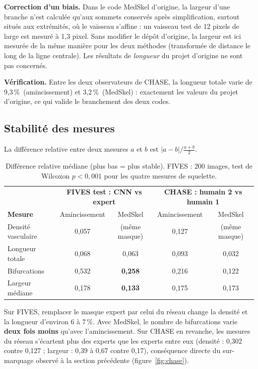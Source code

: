 \documentclass[11pt,a4paper]{article}
\newcommand{\pct}{\,\%}
\begin{document}
\textbf{Correction d'un biais.} Dans le code MedSkel d'origine, la largeur d'une branche n'est calculée qu'aux sommets conservés après simplification, surtout situés aux extrémités, où le vaisseau s'affine : un vaisseau test de 12 pixels de large est mesuré à 1,3 pixel. Sans modifier le dépôt d'origine, la largeur est ici mesurée de la même manière pour les deux méthodes (transformée de distance le long de la ligne centrale). Les résultats de \emph{longueur} du projet d'origine ne sont pas concernés.

\textbf{Vérification.} Entre les deux observateurs de CHASE, la longueur totale varie de 9,3\pct\ (amincissement) et 3,2\pct\ (MedSkel) : exactement les valeurs du projet d'origine, ce qui valide le branchement des deux codes.

\subsection{Stabilité des mesures}
La différence relative entre deux mesures $a$ et $b$ est $|a-b|/\frac{a+b}{2}$.
\begin{table}[h]
\centering\small
\begin{tabular}{@{}lcc|cc@{}}
\toprule
 & \multicolumn{2}{c|}{\textbf{FIVES test : CNN vs expert}} & \multicolumn{2}{c}{\textbf{CHASE : humain 2 vs humain 1}} \\
\textbf{Mesure} & Amincissement & MedSkel & Amincissement & MedSkel \\
\midrule
Densité vasculaire & 0,057 & (même masque) & 0,127 & (même masque) \\
Longueur totale & 0,068 & 0,063 & 0,093 & 0,032 \\
Bifurcations & 0,532 & \textbf{0,258} & 0,216 & 0,122 \\
Largeur médiane & 0,178 & \textbf{0,133} & 0,175 & 0,173 \\
\bottomrule
\end{tabular}
\caption{Différence relative médiane (plus bas = plus stable). FIVES : 200 images, test de Wilcoxon $p<0{,}001$ pour les quatre mesures de squelette.}
\end{table}

Sur FIVES, remplacer le masque expert par celui du réseau change la densité et la longueur d'environ 6 à 7\pct. Avec MedSkel, le nombre de bifurcations varie \textbf{deux fois moins} qu'avec l'amincissement. Sur CHASE en revanche, les mesures du réseau s'écartent plus des experts que les experts entre eux (densité : 0,302 contre 0,127 ; largeur : 0,39 à 0,67 contre 0,17), conséquence directe du sur-marquage observé à la section précédente (figure~\ref{fig:chase}).
\end{document}
